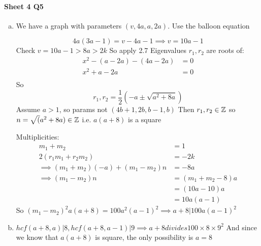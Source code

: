 \documentclass[]{article}
\theoremstyle{definition}
\theoremstyle{remark}
\numberwithin{equation}{section}
\begin{document}
	\paragraph*{Sheet 4 Q5}
		\begin{enumerate}[(a)]
			\item 
				We have a graph with parameters $(v, 4a, a, 2a)$. 
				Use the balloon equation
				
				\[
					4a(3a-1) = v-4a-1 \implies v=  10a - 1
				\]
				Check $v = 10a -1 > 8a > 2k$
				So apply 2.7
				Eigenvalues $r_1, r_2$ are roots of:
				\begin{align*}
					x^2 -(a - 2a) -(4a - 2a) &= 0 \\
					x^2 +a - 2a &= 0\\
				\end{align*}
				So \[ r_1, r_2 = \frac{1}{2}(-a \pm \sqrt{a^2+8a})\]
				Assume $a > 1$, so params not $(4b+1, 2b, b-1, b)$
				Then $r_1, r_2 \in \mathbb{Z}$ so $n = \sqrt(a^2 + 8a) \in \mathbb{Z}$
				i.e. $a(a+8)$ is a square

				Multiplicities:
				\begin{align*}
					m_1 + m_2 &= 1\\
					2(r_1m_1 + r_2m_2) &= -2k\\
					\implies (m_1 + m_2)(-a) +(m_1 - m_2)n &= -8a\\
					\implies (m_1 - m_2)n &= (m_1 + m_2 - 8)a\\
										  &= (10a - 10)a\\
										  &= 10a(a - 1)
				\end{align*}
				So $(m_1 - m_2)^2a(a+8) = 100a^2(a-1)^2 \implies a+8 | 100a(a-1)^2$

			\item 
				$hcf(a+8, a) | 8, hcf(a+8, a-1)| 9 \implies a+8 divides 100\times 8 \times 9^2$
				And since we know that $a(a+8)$ is square, the only possibility is $a =8$
		\end{enumerate}
\end{document}
